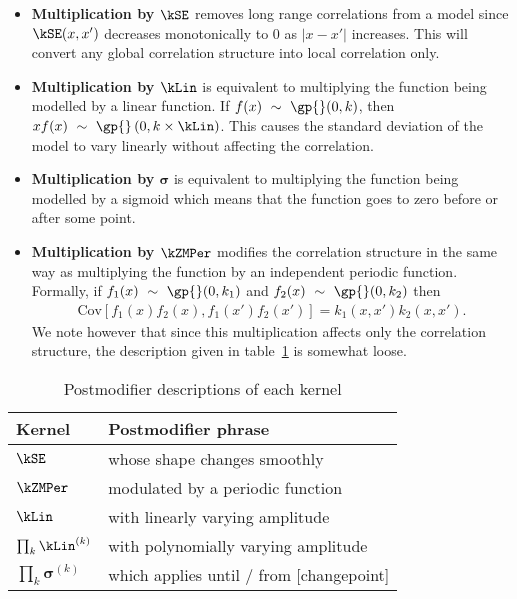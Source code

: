 \begin{itemize}
\item {\bf Multiplication by $\kSE$} removes long range correlations from a model since $\kSE(x,x')$ decreases monotonically to 0 as $|x - x'|$ increases.
This will convert any global correlation structure into local correlation only.
\item {\bf Multiplication by $\kLin$} is equivalent to multiplying the function being modelled by a linear function.
If $f(x) \dist \gp{}(0, \kernel)$, then $xf(x) \dist \gp{}\left(0, k \times \kLin \right)$.
This causes the standard deviation of the model to vary linearly without affecting the correlation.
\item {\bf Multiplication by $\boldsymbol\sigma$} is equivalent to multiplying the function being modelled by a sigmoid which means that the function goes to zero before or after some point.
\item {\bf Multiplication by $\kZMPer$}
modifies the correlation structure in the same way as multiplying the function by an independent periodic function.
Formally, if ${f_1(x) \dist \gp{}(0, \kernel_1)}$ and ${f_2(x) \dist \gp{}(0, \kernel_2)}$ then
\begin{align}
{\textrm{Cov} \left[f_1(x)f_2(x), f_1(x')f_2(x') \right] = k_1(x,x')k_2(x,x')}.\nonumber
\end{align}
We note however that since this multiplication affects only the correlation structure, the description given in table~\ref{table:modifiers} is somewhat loose.
\end{itemize}

\begin{table}[ht]
\centering
\begin{tabular}{l|l}
Kernel & Postmodifier phrase \\
\midrule
$\kSE$  & whose shape changes smoothly \\
$\kZMPer$ & modulated by a periodic function \\
$\kLin$ & with linearly varying amplitude \\
$\prod_k \kLin^{(k)}$ & with polynomially varying amplitude \\
$\prod_k \boldsymbol{\sigma}^{(k)}$ & which applies until / from [changepoint] \\
\end{tabular}
\caption[Postmodifier descriptions of each kernel.]{
Postmodifier descriptions of each kernel
}
\label{table:modifiers}
\end{table}

